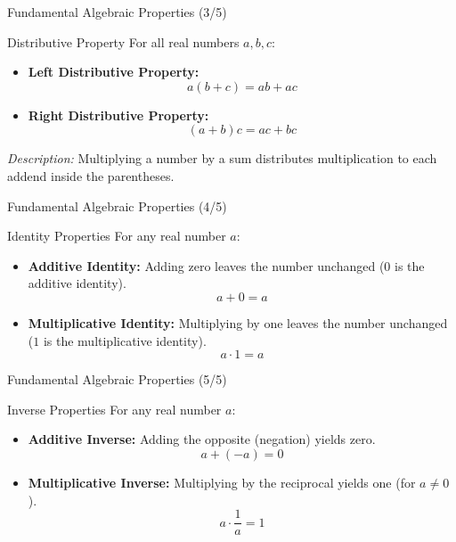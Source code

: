 \begin{frame}{Fundamental Algebraic Properties (3/5)}
\begin{prop}{Distributive Property}{}
For all real numbers $a, b, c$:
\begin{itemize}
\item \textbf{Left Distributive Property:}
\[ a(b + c) = ab + ac \]
\item \textbf{Right Distributive Property:}
\[ (a + b)c = ac + bc \]
\end{itemize}
\textit{Description:} Multiplying a number by a sum distributes multiplication to each addend inside the parentheses.
\end{prop}
\end{frame}

\begin{frame}{Fundamental Algebraic Properties (4/5)}
\begin{prop}{Identity Properties}{}
For any real number $a$:
\begin{itemize}
\item \textbf{Additive Identity:} Adding zero leaves the number unchanged ($0$ is the additive identity).
\[ a + 0 = a \]
\item \textbf{Multiplicative Identity:} Multiplying by one leaves the number unchanged ($1$ is the multiplicative identity).
\[ a \cdot 1 = a \]
\end{itemize}
\end{prop}
\end{frame}

\begin{frame}{Fundamental Algebraic Properties (5/5)}
\begin{prop}{Inverse Properties}{}
For any real number $a$:
\begin{itemize}
\item \textbf{Additive Inverse:} Adding the opposite (negation) yields zero.
\[ a + (-a) = 0 \]
\item \textbf{Multiplicative Inverse:} Multiplying by the reciprocal yields one (for $a \neq 0$).
\[ a \cdot \frac{1}{a} = 1 \]
\end{itemize}
\end{prop}
\end{frame}

